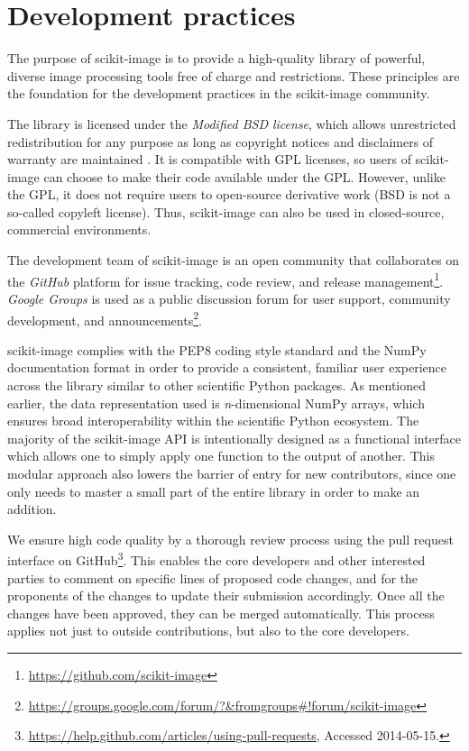 
\section*{Development practices}
  \label{sec:development-practices}

  The purpose of scikit-image is to provide a high-quality library of powerful, diverse image processing tools free of charge and restrictions. These principles are the foundation for the development practices in the scikit-image community.

  The library is licensed under the \emph{Modified BSD license}, which allows unrestricted redistribution for any purpose as long as copyright notices and disclaimers of warranty are maintained \citep{BSD}. It is compatible with GPL licenses, so users of scikit-image can choose to make their code available under the GPL. However, unlike the GPL, it does not require users to open-source derivative work (BSD is not a so-called copyleft license). Thus, scikit-image can also be used in closed-source, commercial environments.

  The development team of scikit-image is an open community that collaborates on the \emph{GitHub} platform for issue tracking, code review, and release management\footnote{\url{https://github.com/scikit-image}}. \emph{Google Groups} is used as a public discussion forum for user support, community development, and announcements\footnote{\url{https://groups.google.com/forum/?&fromgroups\#!forum/scikit-image}}.

  scikit-image complies with the PEP8 coding style standard \citep{PEP8} and the NumPy documentation format \citep{NumpyDoc} in order to provide a consistent, familiar user experience across the library similar to other scientific Python packages. As mentioned earlier, the data representation used is \emph{n}-dimensional NumPy arrays, which ensures broad interoperability within the scientific Python ecosystem. The majority of the scikit-image API is intentionally designed as a functional interface which allows one to simply apply one function to the output of another. This modular approach also lowers the barrier of entry for new contributors, since one only needs to master a small part of the entire library in order to make an addition.

  We ensure high code quality by a thorough review process using the pull
  request interface on GitHub\footnote{\url{https://help.github.com/articles/using-pull-requests}, Accessed 2014-05-15.}.
  This enables the core developers and other interested parties to comment on
  specific lines of proposed code changes, and for the proponents of the
  changes to update their submission accordingly. Once all the changes have
  been approved, they can be merged automatically. This process applies not
  just to outside contributions, but also to the core developers.

